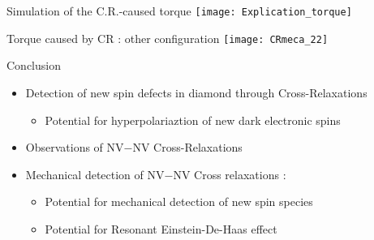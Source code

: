 \documentclass{beamer}
\begin{document}
\begin{frame}{Simulation of the C.R.-caused torque}
\centering
\texttt{[image: Explication\_torque]}
\end{frame}
\begin{frame}{Torque caused by CR : other configuration}
\centering
\texttt{[image: CRmeca\_22]}
\end{frame}
\begin{frame}{Conclusion}
\begin{itemize}
\setlength\itemsep{1em}
\item{Detection of new spin defects in diamond through Cross-Relaxations
\begin{itemize}
\item Potential for hyperpolariaztion of new dark electronic spins
\end{itemize}}
\item{Observations of NV$-$NV Cross-Relaxations}
\item{Mechanical detection of NV$-$NV Cross relaxations :
\begin{itemize}
\item Potential for mechanical detection of new spin species
\item Potential for Resonant Einstein-De-Haas effect 
\end{itemize} }
\end{itemize}
\end{frame}
\end{document}
